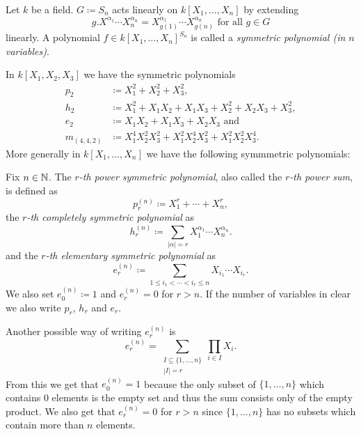 \begin{defi}
  Let $k$ be a field.
  $G \coloneqq S_n$ acts linearly on $k[X_1, \dotsc, X_n]$ by extending
  \[
      g.X^{\alpha_1} \dotsm X_n^{\alpha_n}
    = X_{g(1)}^{\alpha_1} \dotsm X_{g(n)}^{\alpha_n}
    \text{ for all }
    g \in G
  \]
  linearly.
  A polynomial $f \in k[X_1, \dotsc, X_n]^{S_n}$ is called a \emph{symmetric polynomial (in $n$ variables)}.
\end{defi}


\begin{expl}
  In $k[X_1, X_2, X_3]$ we have the symmetric polynomials
  \begin{align*}
                p_2
    &\coloneqq  X_1^2 + X_2^2 + X_3^2,
    \\
                h_2
    &\coloneqq  X_1^2 + X_1 X_2 + X_1 X_3 + X_2^2 + X_2 X_3 + X_3^2,
    \\
                e_2
    &\coloneqq  X_1 X_2 + X_1 X_3 + X_2 X_3
    \text{ and}
    \\
                m_{(4,4,2)}
    &\coloneqq  X_1^4 X_2^2 X_3^2 + X_1^2 X_2^4 X_3^2 + X_1^2 X_2^2 X_3^4.
  \end{align*}
  More generally in $k[X_1, \dotsc, X_n]$ we have the following symmmetric polynomials:
\end{expl}


\begin{defi}
  Fix $n \in \mathbb{N}$.
  The \emph{$r$-th power symmetric polynomial}, also called the \emph{$r$-th power sum}, is defined as
  \[
              p_r^{(n)}
    \coloneqq X_1^r + \dotsb + X_n^r,
  \]
  the \emph{$r$-th completely symmetric polynomial} as
  \[
              h_r^{(n)}
    \coloneqq \sum_{|\alpha|=r} X_1^{\alpha_1} \dotsm X_n^{\alpha_n}.
  \]
  and the \emph{$r$-th elementary symmetric polynomial} as
  \[
              e_r^{(n)}
    \coloneqq \sum_{1 \leq i_1 < \dotsb < i_r \leq n} X_{i_1} \dotsm X_{i_r}.
  \]
  We also set $e_0^{(n)} \coloneqq 1$ and $e_r^{(n)} = 0$ for $r > n$.
  If the number of variables in clear we also write $p_r$, $h_r$ and $e_r$.
\end{defi}

Another possible way of writing $e^{(n)}_r$ is
\[
    e^{(n)}_r
  = \sum_{\substack{I \subseteq \{1, \dotsc, n\} \\ |I| = r}} \prod_{i \in I} X_i.
\]
From this we get that $e^{(n)}_0 = 1$ because the only subset of $\{1, \dotsc, n\}$ which contains $0$ elements is the empty set and thus the sum consists only of the empty product.
We also get that $e^{(n)}_r = 0$ for $r > n$ since $\{1, \dotsc, n\}$ has no subsets which contain more than $n$ elements.


